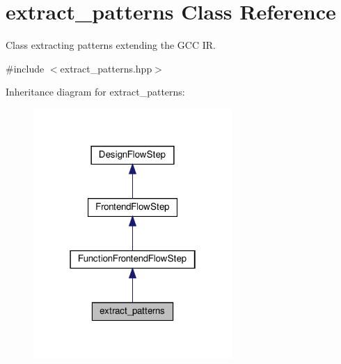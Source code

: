 \hypertarget{classextract__patterns}{}\section{extract\+\_\+patterns Class Reference}
\label{classextract__patterns}


Class extracting patterns extending the G\+CC IR.  




{\ttfamily \#include $<$extract\+\_\+patterns.\+hpp$>$}



Inheritance diagram for extract\+\_\+patterns\+:
\nopagebreak
\begin{figure}[H]
\begin{center}
\leavevmode
\includegraphics[width=214pt]{d3/d49/classextract__patterns__inherit__graph}
\end{center}
\end{figure}


